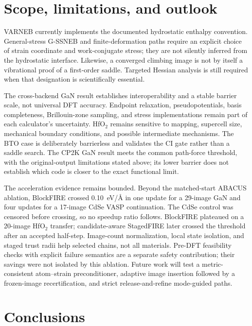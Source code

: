 \documentclass[final,5p,times,twocolumn]{elsarticle}
\begin{document}
\section{Scope, limitations, and outlook}
\label{sec:limits}

VARNEB currently implements the documented hydrostatic enthalpy convention.
General-stress G-SSNEB and finite-deformation paths require an explicit choice
of strain coordinate and work-conjugate stress; they are not silently inferred
from the hydrostatic interface. Likewise, a converged climbing image is not by
itself a vibrational proof of a first-order saddle. Targeted Hessian analysis
is still required when that designation is scientifically essential.

The cross-backend GaN result establishes interoperability and a stable barrier
scale, not universal DFT accuracy. Endpoint relaxation, pseudopotentials,
basis completeness, Brillouin-zone sampling, and stress implementations remain
part of each calculator's uncertainty. HfO$_2$ remains sensitive to mapping,
supercell size, mechanical boundary conditions, and possible intermediate
mechanisms. The BTO case is deliberately barrierless and validates the CI gate
rather than a saddle search. The CP2K GaN result meets the common path-force
threshold, with the original-output limitations stated above; its lower
barrier does not establish which code is closer to the exact functional limit.

The acceleration evidence remains bounded. Beyond the matched-start ABACUS
ablation, BlockFIRE crossed 0.10~eV/\AA{} in one update for a 29-image GaN
and four updates for a 17-image CdSe VASP continuation. The CdSe control was
censored before crossing, so no speedup ratio follows. BlockFIRE plateaued
on a 20-image HfO$_2$ transfer; candidate-aware StagedFIRE later crossed the
threshold after an accepted half-step. Image-count normalization, local state
isolation, and staged trust radii help selected chains, not all materials.
Pre-DFT feasibility checks with explicit failure semantics are a separate
safety contribution; their savings were not isolated by this ablation. Future
work will test a metric-consistent atom--strain preconditioner, adaptive image
insertion followed by a frozen-image recertification, and strict
release-and-refine mode-guided paths.

\FloatBarrier
\balance
\section{Conclusions}
\end{document}
